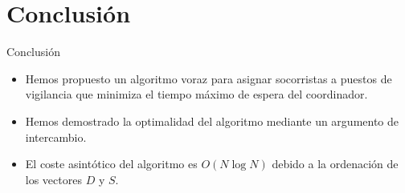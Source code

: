 \documentclass[aspectratio=169]{beamer}
\begin{document}
\section{Conclusión}
\begin{frame}{Conclusión}
    \begin{itemize}
        \item Hemos propuesto un algoritmo voraz para asignar socorristas a puestos de vigilancia que minimiza el tiempo máximo de espera del coordinador.
        \item Hemos demostrado la optimalidad del algoritmo mediante un argumento de intercambio.
        \item El coste asintótico del algoritmo es $O(N \log N)$ debido a la ordenación de los vectores $D$ y $S$.
    \end{itemize}
\end{frame}
\end{document}
